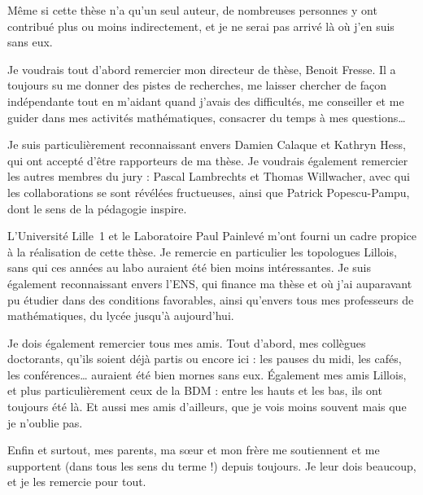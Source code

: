 
Même si cette thèse n'a qu'un seul auteur, de nombreuses personnes y ont contribué plus ou moins indirectement, et je ne serai pas arrivé là où j'en suis sans eux.

Je voudrais tout d'abord remercier mon directeur de thèse, Benoit Fresse.
Il a toujours su me donner des pistes de recherches, me laisser chercher de façon indépendante tout en m'aidant quand j'avais des difficultés, me conseiller et me guider dans mes activités mathématiques, consacrer du temps à mes questions\dots{}

Je suis particulièrement reconnaissant envers Damien Calaque et Kathryn Hess, qui ont accepté d'être rapporteurs de ma thèse.
Je voudrais également remercier  les autres membres du jury : Pascal Lambrechts et Thomas Willwacher, avec qui les collaborations se sont révélées fructueuses, ainsi que Patrick Popescu-Pampu, dont le sens de la pédagogie inspire.

L'Université Lille~1 et le Laboratoire Paul Painlevé m'ont fourni un cadre propice à la réalisation de cette thèse.
Je remercie en particulier les topologues Lillois, sans qui ces années au labo auraient été bien moins intéressantes.
Je suis également reconnaissant envers l'ENS, qui finance ma thèse et où j'ai auparavant pu étudier dans des conditions favorables, ainsi qu'envers tous mes professeurs de mathématiques, du lycée jusqu'à aujourd'hui.

Je dois également remercier tous mes amis.
Tout d'abord, mes collègues doctorants, qu'ils soient déjà partis ou encore ici : les pauses du midi, les cafés, les conférences\dots{} auraient été bien mornes sans eux.
Également mes amis Lillois, et plus particulièrement ceux de la BDM : entre les hauts et les bas, ils ont toujours été là.
Et aussi mes amis d'ailleurs, que je vois moins souvent mais que je n'oublie pas.

Enfin et surtout, mes parents, ma sœur et mon frère me soutiennent et me supportent (dans tous les sens du terme !) depuis toujours.
Je leur dois beaucoup, et je les remercie pour tout.
